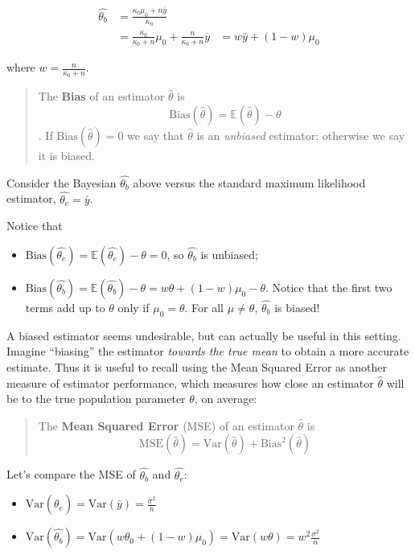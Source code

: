 \documentclass[]{article}
\providecommand{\tightlist}{%
  \setlength{\itemsep}{0pt}\setlength{\parskip}{0pt}}
\begin{document}
\begin{align}
\hat{\theta_b} &= \frac{\kappa_0 \mu_0 + n\bar{y}}{\kappa_n} \\
&= \frac{\kappa_0}{\kappa_0 + n} \mu_0 + \frac{n}{\kappa_0 + n}\bar{y}
&= w \bar{y} + (1 - w) \mu_0
\end{align}

where \(w = \frac{n}{\kappa_0 + n}\).

\begin{quote}
The \textbf{Bias} of an estimator \(\hat{\theta}\) is
\[\text{Bias}(\hat{\theta}) = \mathbb{E}(\hat{\theta}) - \theta\]. If
\(\text{Bias}(\hat{\theta}) = 0\) we say that \(\hat{\theta}\) is an
\emph{unbiased} estimator; otherwise we say it is biased.
\end{quote}

Consider the Bayesian \(\hat{\theta_b}\) above versus the standard
maximum likelihood estimator, \(\hat{\theta_e} = \bar{y}\).

Notice that

\begin{itemize}
\tightlist
\item
  \(\text{Bias}(\hat{\theta_e}) = \mathbb{E}(\hat{\theta_e}) - \theta = 0\),
  so \(\hat{\theta_b}\) is unbiased;
\item
  \(\text{Bias}(\hat{\theta_b}) = \mathbb{E}(\hat{\theta_b}) - \theta = w\theta + (1 - w)\mu_0 - \theta\).
  Notice that the first two terms add up to \(\theta\) only if
  \(\mu_0 = \theta\). For all \(\mu \neq \theta\), \(\hat{\theta_b}\) is
  biased!
\end{itemize}

A biased estimator seems undesirable, but can actually be useful in this
setting. Imagine ``biasing'' the estimator \emph{towards the true mean}
to obtain a more accurate estimate. Thus it is useful to recall using
the Mean Squared Error as another measure of estimator performance,
which measures how close an estimator \(\hat{\theta}\) will be to the
true population parameter \(\theta\), on average:

\begin{quote}
The \textbf{Mean Squared Error} (MSE) of an estimator \(\hat{\theta}\)
is
\[\text{MSE}(\hat{\theta}) = \text{Var}(\hat{\theta}) + \text{Bias}^2(\hat{\theta})\]
\end{quote}

Let's compare the MSE of \(\hat{\theta_b}\) and \(\hat{\theta_e}\):

\begin{itemize}
\tightlist
\item
  \(\text{Var}(\hat{\theta_e}) = \text{Var}(\bar{y}) = \frac{\sigma^2}{n}\)
\item
  \(\text{Var}(\hat{\theta_b}) = \text{Var}(w \theta_0 + (1 - w)\mu_0) = \text{Var}(w \theta) = w^2 \frac{\sigma^2}{n}\)
\end{itemize}
\end{document}
